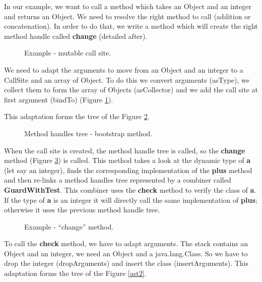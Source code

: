 \documentclass{sig-alternate}
\begin{document}
      In our example, we want to call a method which takes an Object and an integer and returns an Object.
      We need to resolve the right method to call (addition or concatenation).
      In order to do that, we write a method which will create the right method handle called {\bf change} (detailed after).

      \begin{figure}[!h]
        \centering 
        \caption{Example - mutable call site.}
        \label{fooMCS}
      \end{figure}

      We need to adapt the arguments to move from an Object and an integer to a CallSite and an array of Object.
      To do this we convert arguments (asType), we collect them to form the array of Objects (asCollector) and we add the call site at first argument (bindTo) (Figure \ref{fooMCS}).

      \noindent This adaptation forms the tree of the Figure \ref{ast1}.

      \begin{figure}[!h]
        \centering \resizebox{.7\linewidth}{!}{}
        \caption{Method handles tree - bootstrap method.}
        \label{ast1}
      \end{figure}

      When the call site is created, the method handle tree is called, so the {\bf change} method (Figure \ref{fooCHANGE}) is called.
      This method takes a look at the dynamic type of {\bf a} (let say an integer),
      finds the corresponding implementation of the {\bf plus} method
      and then re-links a method handles tree represented by a combiner called {\bf GuardWithTest}.
      This combiner uses the {\bf check} method to verify the class of {\bf a}.
      If the type of {\bf a} is an integer it will directly call the same implementation of {\bf plus};
      otherwise it uses the previous method handle tree.

      \begin{figure}[!h]
        \centering 
        \caption{Example - ``change'' method.}
        \label{fooCHANGE}
      \end{figure}

      To call the {\bf check} method, we have to adapt arguments.
      The stack contains an Object and an integer, we need an Object and a java.lang.Class.
      So we have to drop the integer (dropArguments) and insert the class (insertArguments).
      This adaptation forms the tree of the Figure \ref{ast2}.
\end{document}
